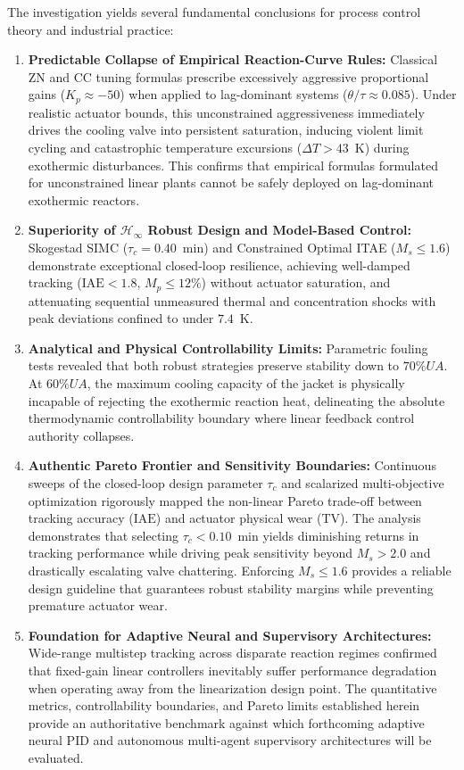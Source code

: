 The investigation yields several fundamental conclusions for process control theory and industrial practice:
\begin{enumerate}
    \item \textbf{Predictable Collapse of Empirical Reaction-Curve Rules:} Classical ZN and CC tuning formulas prescribe excessively aggressive proportional gains ($K_p \approx -50$) when applied to lag-dominant systems ($\theta/\tau \approx 0.085$). Under realistic actuator bounds, this unconstrained aggressiveness immediately drives the cooling valve into persistent saturation, inducing violent limit cycling and catastrophic temperature excursions ($\Delta T > 43$~K) during exothermic disturbances. This confirms that empirical formulas formulated for unconstrained linear plants cannot be safely deployed on lag-dominant exothermic reactors.
    
    \item \textbf{Superiority of $\mathcal{H}_\infty$ Robust Design and Model-Based Control:} Skogestad SIMC ($\tau_c = 0.40$~min) and Constrained Optimal ITAE ($M_s \le 1.6$) demonstrate exceptional closed-loop resilience, achieving well-damped tracking ($\text{IAE} < 1.8$, $M_p \le 12\%$) without actuator saturation, and attenuating sequential unmeasured thermal and concentration shocks with peak deviations confined to under $7.4$~K.
    
    \item \textbf{Analytical and Physical Controllability Limits:} Parametric fouling tests revealed that both robust strategies preserve stability down to $70\% UA$. At $60\% UA$, the maximum cooling capacity of the jacket is physically incapable of rejecting the exothermic reaction heat, delineating the absolute thermodynamic controllability boundary where linear feedback control authority collapses.
    
    \item \textbf{Authentic Pareto Frontier and Sensitivity Boundaries:} Continuous sweeps of the closed-loop design parameter $\tau_c$ and scalarized multi-objective optimization rigorously mapped the non-linear Pareto trade-off between tracking accuracy ($\text{IAE}$) and actuator physical wear ($\text{TV}$). The analysis demonstrates that selecting $\tau_c < 0.10$~min yields diminishing returns in tracking performance while driving peak sensitivity beyond $M_s > 2.0$ and drastically escalating valve chattering. Enforcing $M_s \le 1.6$ provides a reliable design guideline that guarantees robust stability margins while preventing premature actuator wear.
    
    \item \textbf{Foundation for Adaptive Neural and Supervisory Architectures:} Wide-range multistep tracking across disparate reaction regimes confirmed that fixed-gain linear controllers inevitably suffer performance degradation when operating away from the linearization design point. The quantitative metrics, controllability boundaries, and Pareto limits established herein provide an authoritative benchmark against which forthcoming adaptive neural PID and autonomous multi-agent supervisory architectures will be evaluated.
\end{enumerate}
